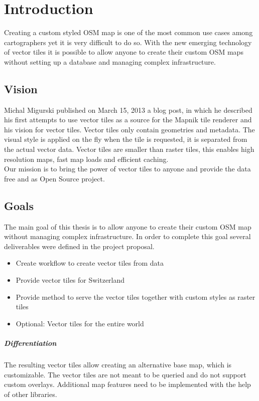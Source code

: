 \chapter{Introduction}


Creating a custom styled OSM map is one of the most common use cases
among cartographers yet it is very difficult to do so. With the new
emerging technology of vector tiles it is possible to allow anyone to
create their custom OSM maps without setting up a database and
managing complex infrastructure.


\section{Vision}\label{part1_vision}

Michal Migurski published on March 15, 2013 a blog
post\cite{1_mike.teczno.com_2013},
in which he described his first attempts to use vector tiles as a source
for the Mapnik tile renderer and his vision for vector tiles.
\newline{}
Vector tiles only contain geometries and metadata.
The visual style is applied on the fly when the tile is requested, it is separated from the
actual vector data. Vector tiles are smaller than raster tiles, this enables high resolution maps, fast map loads and efficient caching.\cite{2_mapbox.com_2015} \\
Our mission is to bring the power of vector tiles to anyone and provide
the data free and as Open Source project.


\section{Goals}\label{goals}

The main goal of this thesis is to allow anyone to create their custom
OSM map without managing complex infrastructure. In order to complete this goal
several deliverables were defined in the project proposal.

\begin{itemize}
\item
  Create workflow to create vector tiles from \osm{} data
\item
  Provide vector tiles for Switzerland
\item
  Provide method to serve the vector tiles together with
  custom styles as raster tiles
\item
  Optional: Vector tiles for the entire world
\end{itemize}

\paragraph{Differentiation} The resulting vector tiles allow creating an alternative base map, which is customizable. The vector tiles are not meant to be queried and do not support custom overlays. Additional map features need to be implemented with the help of other libraries. 